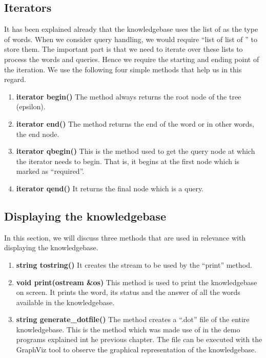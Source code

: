 \subsection{Iterators}
	It has been explained already that the knowledgebase uses the list of \integer as the type of words. When we consider query handling, we would require ``list of list of \integer'' to store them. The important part is that we need to iterate over these lists to process the words and queries. Hence we require the starting and ending point of the iteration. We use the following four simple methods that help us in this regard.
\begin{enumerate}
\item \textbf{iterator begin()} \hfill \vskip 1pt
	The method always returns the root node of the tree (epsilon).

\item \textbf{iterator end()} \hfill \vskip 1pt
	The method returns the end of the word or in other words, the end node. 
	 
\item \textbf{iterator qbegin()} \hfill \vskip 1pt
	This is the method used to get the query node at which the iterator needs to begin. That is, it begins at the first node which is marked as ``required''.
	
\item \textbf{iterator qend()} \hfill \vskip 1pt
	It returns the final node which is a query.
\end{enumerate}

\subsection{Displaying the knowledgebase}
In this section, we will discuss three methods that are used in relevance with displaying the knowledgebase.
\begin{enumerate}
\item \textbf{string tostring()} \hfill \vskip 1pt
It creates the \stringtype stream to be used by the ``print'' method.

\item \textbf{void print(ostream \&os)} \hfill \vskip 1pt
	This method is used to print the knowledgebase on screen. It prints the word, its status and the answer of all the words available in the knowledgebase.

\item \textbf{string generate\_dotfile()} \hfill \vskip 1pt
	The method creates a ``.dot'' file of the entire knowledgebase. This is the method which was made use of in the demo programs explained int he previous chapter. The file can be executed with the GraphViz tool to observe the graphical representation of the knowledgebase. 
\end {enumerate}

